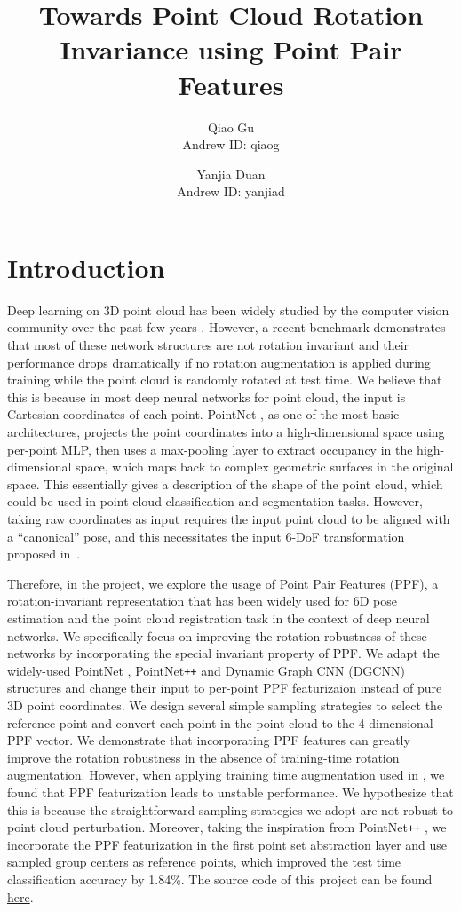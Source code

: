 \documentclass{article}
\title{Towards Point Cloud Rotation Invariance using Point Pair Features}
\author{Qiao Gu \\
  Andrew ID: qiaog
  \and
  Yanjia Duan \\
  Andrew ID: yanjiad
  }
\date{}
\begin{document}
\maketitle

\section{Introduction}

Deep learning on 3D point cloud has been widely studied by the computer vision community over the past few years \cite{Qi2017pointnet, qi2017pointnet2, Wang2019-dgcnn, Li2018-PointCNN}. 
However, a recent benchmark \cite{taghanaki2020robustpointset} demonstrates that most of these network structures are not rotation invariant and their performance drops dramatically if no rotation augmentation is applied during training while the point cloud is randomly rotated at test time. 
We believe that this is because in most deep neural networks for point cloud, the input is Cartesian coordinates of each point. PointNet \cite{Qi2017pointnet}, as one of the most basic architectures, projects the point coordinates into a high-dimensional space using per-point MLP, then uses a max-pooling layer to extract occupancy in the high-dimensional space, which maps back to complex geometric surfaces in the original space. This essentially gives a description of the shape of the point cloud, which could be used in point cloud classification and segmentation tasks.
However, taking raw coordinates as input requires the input point cloud to be aligned with a ``canonical'' pose, and this necessitates the input 6-DoF transformation proposed in~\cite{Qi2017pointnet}. 

Therefore, in the project, we explore the usage of Point Pair Features (PPF), a rotation-invariant representation that has been widely used for 6D pose estimation and the point cloud registration task in the context of deep neural networks. We specifically focus on improving the rotation robustness of these networks by incorporating the special invariant property of PPF. 
We adapt the widely-used PointNet \cite{Qi2017pointnet}, PointNet\texttt{++} \cite{qi2017pointnet2} and Dynamic Graph CNN (DGCNN) \cite{Wang2019-dgcnn} structures and change their input to per-point PPF featurizaion instead of pure 3D point coordinates. 
We design several simple sampling strategies to select the reference point and convert each point in the point cloud to the 4-dimensional PPF vector. We demonstrate that incorporating PPF features can greatly improve the rotation robustness in the absence of training-time rotation augmentation. 
However, when applying training time augmentation used in \cite{qi2017pointnet2}, we found that PPF featurization leads to unstable performance. We hypothesize that this is because the straightforward sampling strategies we adopt are not robust to point cloud perturbation.
Moreover, taking the inspiration from PointNet\texttt{++} \cite{qi2017pointnet2}, we incorporate the PPF featurization in the first point set abstraction layer and use sampled group centers as reference points, which improved the test time classification accuracy by 1.84\%. The source code of this project can be found \href{http://www.overleaf.com}{here}. 
\end{document}
